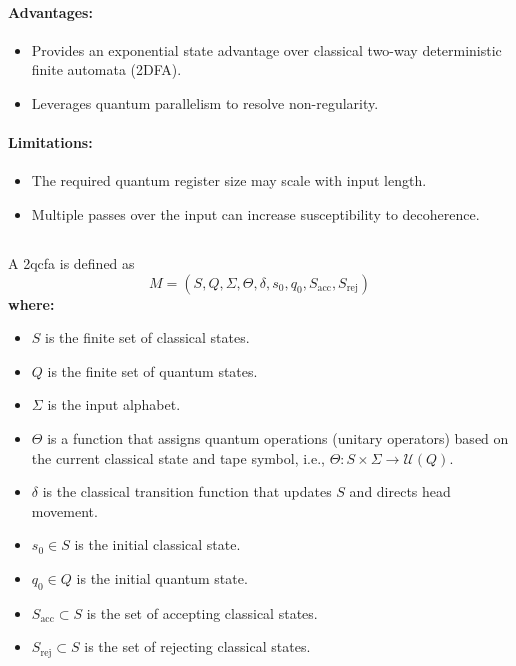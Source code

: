\paragraph{Advantages:}
\begin{itemize}
    \item Provides an exponential state advantage over classical two-way deterministic finite automata (2DFA).
    \item Leverages quantum parallelism to resolve non-regularity.
\end{itemize}

\paragraph{Limitations:}
\begin{itemize}
    \item The required quantum register size may scale with input length.
    \item Multiple passes over the input can increase susceptibility to decoherence.
\end{itemize}

\subsection{}
\label{subsec:2qcfa}
\begin{definition}
A \gls{2qcfa} is defined as 
\[
M = (S, Q, \Sigma, \Theta, \delta, s_0, q_0, S_{\text{acc}}, S_{\text{rej}})
\]
\textbf{where:}
\begin{itemize}
    \item \( S \) is the finite set of classical states.
    \item \( Q \) is the finite set of quantum states.
    \item \( \Sigma \) is the input alphabet.
    \item \( \Theta \) is a function that assigns quantum operations (unitary operators) based on the current classical state and tape symbol, i.e., \(\Theta: S \times \Sigma \to \mathcal{U}(Q)\).
    \item \( \delta \) is the classical transition function that updates \( S \) and directs head movement.
    \item \( s_0 \in S \) is the initial classical state.
    \item \( q_0 \in Q \) is the initial quantum state.
    \item \( S_{\text{acc}} \subset S \) is the set of accepting classical states.
    \item \( S_{\text{rej}} \subset S \) is the set of rejecting classical states.
\end{itemize}
\end{definition}

